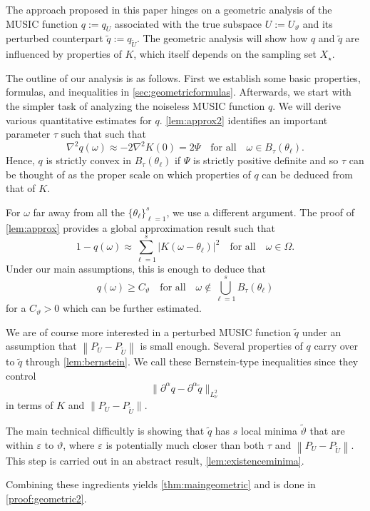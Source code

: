 \documentclass[11pt]{article}
\theoremstyle{definition}
\numberwithin{theorem}{section}
\numberwithin{lemma}{section}
\numberwithin{equation}{section}
\renewcommand{\tilde}{\widetilde}
\renewcommand{\epsilon}{\varepsilon}
\def\forallspace{\quad\text{for all}\quad}
\newcommand{\norm}[1]{{\left\|#1\right\|}}
\numberwithin{equation}{section}
\begin{document}
   	The approach  proposed in this paper hinges on a  geometric analysis of the MUSIC function $q:=q_U$ associated with the true subspace $U:=U_\vartheta$ and its perturbed counterpart $\tilde q:=q_{\tilde U}$. The geometric analysis will show how $q$ and $\tilde q$ are influenced by properties of $K$, which itself depends on the sampling set $X_\star$.	
	
	The outline of our analysis is as follows. First we establish  some basic properties, formulas, and inequalities in \cref{sec:geometricformulas}. Afterwards, we start with the simpler task of analyzing the noiseless MUSIC function $q$. We will derive various quantitative estimates for $q$. \cref{lem:approx2} identifies an important parameter $\tau$ such that such that 
	$$
	\nabla^2 q (\omega)\approx -2\nabla^2 K(0)=2\Psi \forallspace \omega\in B_\tau(\theta_\ell).
	$$ 
	Hence, $q$ is strictly convex in $B_\tau(\theta_\ell)$ if $\Psi$ is strictly positive definite and so $\tau$ can be thought of as the proper scale on which properties of $q$ can be deduced from that of $K$. 
	
	For $\omega$ far away from all the $\{\theta_\ell\}_{\ell=1}^s$, we use a different argument. The proof of \cref{lem:approx} provides a global approximation result such that 
	$$
	1-q(\omega) \approx \sum_{\ell=1}^s |K(\omega -\theta_\ell)|^2 \forallspace \omega\in \Omega.
	$$ 
	Under our main assumptions, this is enough to deduce that 
	$$
	q(\omega)\geq C_\vartheta \forallspace \omega\not\in \bigcup_{\ell=1}^s B_\tau(\theta_\ell)
	$$ 
	for a $C_\vartheta>0$ which can be further estimated.

	We are of course more interested in a perturbed MUSIC function $\tilde q$ under an assumption that $\norm{P_U-P_{\tilde U}}$ is small enough. Several properties of $q$ carry over to $\tilde q$ through \cref{lem:bernstein}. We call these Bernstein-type inequalities since they control 
	$$
	\|\partial^\alpha q - \partial^\alpha \tilde q\|_{L^2_\nu}
	$$
	in terms of $K$ and $\|P_U-P_{\tilde U}\|$. 
	
	The main technical difficultly is showing that $\tilde q$ has $s$ local minima $\tilde \vartheta$ that are within $\epsilon$ to $\vartheta$, where $\epsilon$ is potentially much closer than both $\tau$ and $\norm{P_U-P_{\tilde U}}$. This step is carried out in an abstract result, \cref{lem:existenceminima}. 
	
	Combining these ingredients yields \cref{thm:maingeometric} and is done in \cref{proof:geometric2}.
	
\end{document}
